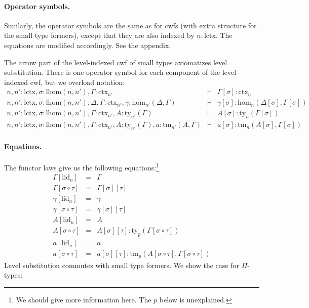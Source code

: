 \documentclass[11pt,a4paper]{article}
\theoremstyle{definition}
\def\lhom{\mathrm{lhom}}
\def\Hom{\mathrm{hom}}
\def\lctx{\mathrm{lctx}}
\def\lid{\mathrm{lid}}
\newcommand{\ctx}{\mathrm{ctx}}
\newcommand{\ty}{\mathrm{ty}}
\newcommand{\tm}{\mathrm{tm}}
\begin{document}
\paragraph{Operator symbols.} Similarly, the operator symbols are the same as for cwfs (with extra structure for the small type formers), except that they are also indexed by $n : \lctx$. The equations are modified accordingly. See the appendix.

The arrow part of the level-indexed cwf of small types axiomatizes level substitution. There is one operator symbol for each component of the level-indexed cwf, but we overload notation:
\begin{eqnarray*}
n, n' : \lctx , \sigma : \lhom(n,n'), \Gamma : \ctx_{n'} &\vdash& 
\Gamma[\sigma] : \ctx_n\\
n, n' : \lctx , \sigma : \lhom(n,n'), \Delta,\Gamma : \ctx_{n'}, \gamma : \Hom_{n'}(\Delta,\Gamma) 
&\vdash& 
\gamma[\sigma] : \Hom_{n}(\Delta[\sigma],\Gamma[\sigma]) \\
n, n' : \lctx , \sigma : \lhom(n,n'), \Gamma : \ctx_{n'}, A:\ty_{n'}(\Gamma)
&\vdash& 
A[\sigma]: \ty_n(\Gamma[\sigma])\\
n,n' : \lctx , \sigma : \lhom(n,n'), \Gamma : \ctx_{n'}, A:\ty_{n'}(\Gamma), a : \tm_{n'}(A,\Gamma) 
&\vdash& 
a[\sigma] : \tm_{n}(A[\sigma],\Gamma[\sigma]) 
\end{eqnarray*}
\paragraph{Equations.}
The functor laws give us the following equations:\footnote{%
We should give more information here. The $p$ below is unexplained.}
\begin{eqnarray*}
\Gamma[\lid_n] &=& \Gamma\\
\Gamma[\sigma \circ \tau] &=& \Gamma[\sigma][\tau]\\
\gamma[\lid_n] &=& \gamma\\
\gamma[\sigma \circ \tau] &=& \gamma[\sigma][\tau]\\
A[\lid_n] &=& A\\
A[\sigma \circ \tau] &=& A[\sigma][\tau]: \ty_p(\Gamma[\sigma \circ \tau])\\
a[\lid_n] &=& a\\
a[\sigma \circ \tau] &=& a[\sigma][\tau]: \tm_p(A[\sigma \circ \tau],\Gamma[\sigma \circ \tau])
\end{eqnarray*}
Level substitution commutes with small type formers. We show the case for $\Pi$-types:
\end{document}
